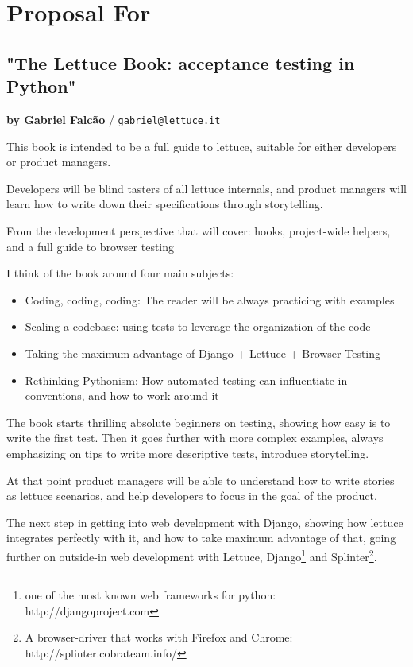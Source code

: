 \documentclass[letterpaper]{article}
\begin{document}
\section*{Proposal For}

\subsection*{"The Lettuce Book: acceptance testing in Python"}
\normalsize\textbf{by Gabriel Falcão} \large{/} \texttt{gabriel@lettuce.it}

\normalsize

This book is intended to be a full guide to lettuce, suitable for
either developers or product managers.

\noindent
Developers will be blind tasters of all lettuce internals, and product
managers will learn how to write down their specifications through
storytelling.

\noindent
From the development perspective that will cover: hooks, project-wide
helpers, and a full guide to browser testing

\noindent
I think of the book around four main subjects:

\begin{itemize}

\item{Coding, coding, coding: The reader will be always practicing with examples}

\item{Scaling a codebase: using tests to leverage the organization of the code}

\item{Taking the maximum advantage of Django + Lettuce + Browser Testing}

\item{Rethinking Pythonism: How automated testing can influentiate in conventions, and how to work around it}
\end{itemize}

\noindent

The book starts thrilling absolute beginners on testing, showing how easy is to write the first test.
Then it goes further with more complex examples, always emphasizing on
tips to write more descriptive tests, introduce storytelling.

\noindent
At that point product managers will be able to understand how to write
stories as lettuce scenarios, and help developers to focus in the goal
of the product.

\noindent
The next step in getting into web development with Django, showing how
lettuce integrates perfectly with it, and how to take maximum
advantage of that, going further on outside-in web development with
Lettuce, Django\footnote{one of the most known web frameworks for python: http://djangoproject.com} and Splinter\footnote{A browser-driver that works with Firefox and Chrome: http://splinter.cobrateam.info/}.
\end{document}
